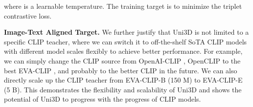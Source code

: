 \documentclass{article} \usepackage{iclr2024_conference,times}
\def\Ours{Uni3D\xspace}
\begin{document}
where  is a learnable temperature. The training target is to minimize the triplet contrastive loss.

\textbf{Image-Text Aligned Target.} We further justify that \Ours is not limited to a specific CLIP teacher, where we can switch it to off-the-shelf SoTA CLIP models with different model scales flexibly to achieve better performance. For example, we can simply change the CLIP source from OpenAI-CLIP \citep{radford2021learning}, OpenCLIP \citep{cherti2023reproducible} to the best EVA-CLIP \citep{sun2023eva}, and probably to the better CLIP in the future. We can also directly scale up the CLIP teacher from EVA-CLIP-B (150 M) to EVA-CLIP-E (5 B). This demonstrates the flexibility and scalability of \Ours and shows the potential of \Ours to progress with the progress of CLIP models.
\end{document}
